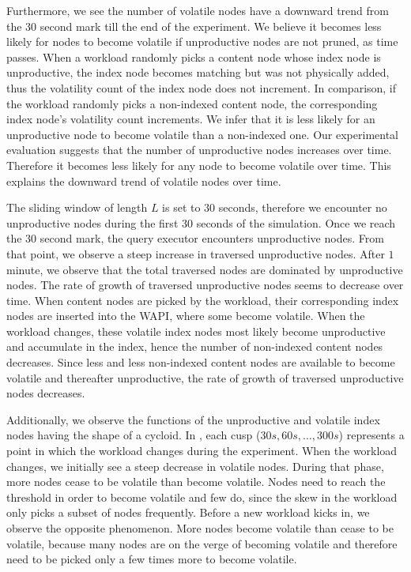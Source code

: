 \documentclass[abstracton,12pt]{scrartcl}
\theoremstyle{definition}
\begin{document}
Furthermore, we see the number of volatile nodes have a downward trend from the
30 second mark till the end of the experiment. We believe it becomes less likely
for nodes to become volatile if unproductive nodes are not pruned,
as time passes. When a workload randomly picks a content node whose index node is
unproductive, the index
node becomes matching but was not physically added, thus the volatility count of
the index node
does not increment. In comparison, if the workload randomly picks a non-indexed
content node, the corresponding index node's volatility count increments.
We infer that it is less
likely for an unproductive node to become volatile than a non-indexed one.
Our experimental evaluation suggests that the number of
unproductive nodes increases over time. Therefore it becomes less likely for any
node to become volatile over time. This explains the downward trend of
volatile nodes over time.

The sliding window of length $L$ is set to $30$ seconds, therefore we encounter no
unproductive nodes during the first $30$ seconds of the simulation. Once we
reach the $30$ second mark, the query executor encounters unproductive nodes.
From that point, we observe a steep increase in traversed unproductive nodes.
After $1$ minute, we observe that the total traversed nodes are dominated by
unproductive nodes. The rate of growth of traversed unproductive nodes seems to
decrease over time. When content nodes are picked by the
workload, their corresponding index nodes are inserted into the WAPI, where some
become volatile. When the workload changes, these volatile index nodes most
likely become unproductive and accumulate in the index, hence the number of non-indexed
content nodes decreases. Since less and less non-indexed content nodes are
available to become volatile and thereafter unproductive, the rate of growth of
traversed unproductive nodes decreases.


Additionally, we observe the functions of the unproductive and volatile index
nodes having the shape of a cycloid. In , each
cusp ($30 s, 60 s, \dots, 300 s$) represents a point in which the workload
changes during the experiment. When the workload changes, we initially see a
steep decrease in volatile nodes. During that phase, more nodes cease to be
volatile than become volatile. Nodes need to reach the threshold in order to
become volatile and few do, since the skew in the workload only picks a subset of
nodes frequently. Before a new workload kicks in, we observe the opposite
phenomenon. More nodes become volatile than cease to be volatile, because many nodes are
on the verge of becoming volatile and therefore need to be picked only a few
times more to become volatile. 
\end{document}
